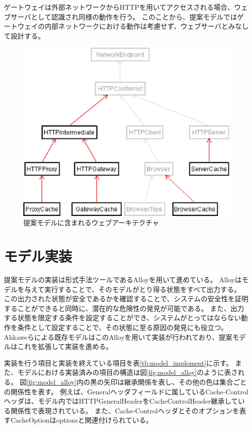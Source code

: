 \documentclass{css}
\begin{document}
ゲートウェイは外部ネットワークからHTTPを用いてアクセスされる場合、ウェブサーバとして認識され同様の動作を行う。
このことから、提案モデルではゲートウェイの内部ネットワークにおける動作は考慮せず、ウェブサーバとみなして設計する。

\begin{figure}[htb]
\centering
\includegraphics[width=0.8\hsize]{model_archi.eps}
\caption{提案モデルに含まれるウェブアーキテクチャ}
\label{fig:model_header}
\end{figure}

\section{モデル実装}
提案モデルの実装は形式手法ツールであるAlloyを用いて進めている。
\color{red}
Alloyはモデルを与えて実行することで、そのモデルがとり得る状態をすべて出力する。
この出力された状態が安全であるかを確認することで、システムの安全性を証明することができると同時に、潜在的な危険性の発見が可能である。
また、出力する状態を限定する条件を設定することができ、システムがとってはならない動作を条件として設定することで、その状態に至る原因の発見にも役立つ。
\color{black}
Ahkaweらによる既存モデル\cite{webmodel}はこのAlloyを用いて実装が行われており、提案モデルはこれを拡張して実装を進める。

\color{red}
実装を行う項目と実装を終えている項目を表\ref{tb:model_implement}に示す。
また、モデルにおける実装済みの項目の構造は図\ref{fig:model_alloy}のように表される。
図\ref{fig:model_alloy}内の黒の矢印は継承関係を表し、その他の色は集合ごとの関係性を表す。
例えば、Generalヘッダフィールドに属しているCache-Controlヘッダは、モデル内ではHTTPGeneralHeaderをCacheControlHeader継承している関係性で表現されている。
また、Cache-Controlヘッダとそのオプションを表すCacheOptionはoptionsと関連付けられている。
\color{black}
\end{document}
